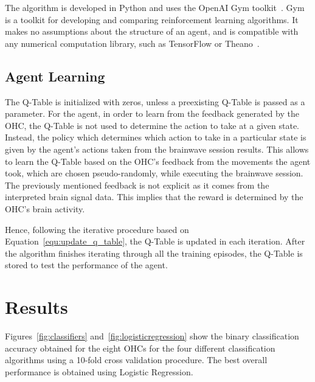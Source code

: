 \documentclass[journal]{IEEEtran}
\begin{document}
{{The algorithm is developed in Python and uses the OpenAI Gym toolkit~\cite{openai}. Gym is a toolkit for developing and comparing reinforcement learning algorithms. It makes no assumptions about the structure of an agent, and is compatible with any numerical computation library, such as TensorFlow or Theano~\cite{tensorflow2015-whitepaper}.

\subsection{Agent Learning}
\label{q_learning_step_alg}
The Q-Table is initialized with zeros, unless a preexisting Q-Table is passed as a parameter.  For the agent, in order to learn from the feedback generated by the OHC, the Q-Table is not used to determine the action to take at a given state. Instead, the policy which determines which action to take in a particular state is given by the agent's actions taken from the brainwave session results. This allows to learn the Q-Table based on the OHC's feedback from the movements the agent took, which are chosen pseudo-randomly, while executing the brainwave session. The previously mentioned feedback is not explicit as it comes from the interpreted brain signal data. This implies that the reward is determined by the OHC's brain activity. 

Hence, following the iterative procedure based on Equation~\ref{equ:update_q_table}, the Q-Table is updated in each iteration.  After the algorithm finishes iterating through all the training episodes, the Q-Table is stored to test the performance of the agent.


\section{Results}
\label{results}

Figures~\ref{fig:classifiers} and~\ref{fig:logisticregression} show the binary classification accuracy obtained for the eight OHCs for the four different classification algorithms using a 10-fold cross validation procedure.  The best overall performance is obtained using Logistic Regression.

}}
\end{document}
